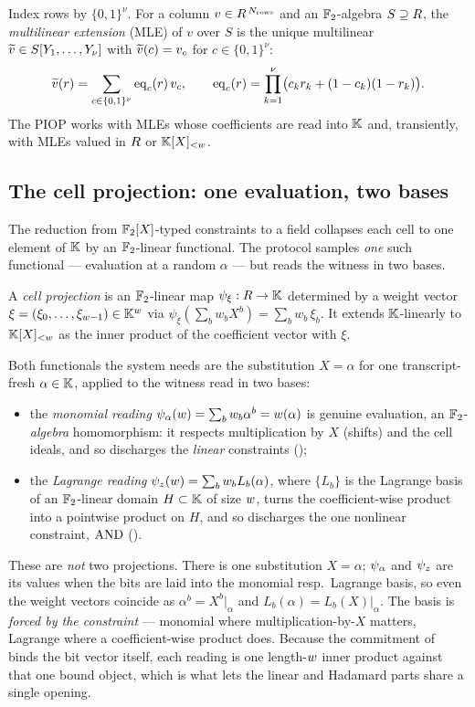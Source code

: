 Index rows by $\{0,1\}^{\nu}$. For a column $v\in R^{\,N_{\mathrm{rows}}}$
and an $\mathbb{F}_2$-algebra $S\supseteq R$, the \emph{multilinear extension}
(MLE) of $v$ over $S$ is the unique multilinear $\widetilde{v}\in S[Y_1,\dots,Y_\nu]$
with $\widetilde{v}(c) = v_c$ for $c\in\{0,1\}^\nu$:
\[
  \widetilde{v}(r) = \sum_{c\in\{0,1\}^{\nu}} \operatorname{eq}_c(r)\,v_c,
  \qquad
  \operatorname{eq}_c(r) = \prod_{k=1}^{\nu}\bigl(c_k r_k + (1-c_k)(1-r_k)\bigr).
\]
The PIOP works with MLEs whose coefficients are read into $\mathbb{K}$ and, transiently,
with MLEs valued in $R$ or $\mathbb{K}[X]_{<w}$.

\subsection{The cell projection: one evaluation, two bases}
\label{sec:projections}

The reduction from $\mathbb{F}_2[X]$-typed constraints to a field collapses each cell
to one element of $\mathbb{K}$ by an $\mathbb{F}_2$-linear functional. The protocol samples
\emph{one} such functional --- evaluation at a random $\alpha$ --- but reads the
witness in two bases.

\begin{definition}
\label{def:projection}
A \emph{cell projection} is an $\mathbb{F}_2$-linear map $\psi_\xi:R\to\mathbb{K}$
determined by a weight vector $\xi = (\xi_0,\dots,\xi_{w-1})\in\mathbb{K}^{w}$
via $\psi_\xi(\sum_b w_b X^b) = \sum_b w_b\,\xi_b$. It extends $\mathbb{K}$-linearly to
$\mathbb{K}[X]_{<w}$ as the inner product of the coefficient vector with $\xi$.
\end{definition}

Both functionals the system needs are the substitution $X = \alpha$ for one
transcript-fresh $\alpha\in\mathbb{K}$, applied to the witness read in two bases:
\begin{itemize}[leftmargin=2em]
  \item the \emph{monomial reading}
    $\psi_{\alpha}(w) = \sum_b w_b\alpha^b = w(\alpha)$ is genuine evaluation, an
    $\mathbb{F}_2$-\emph{algebra} homomorphism: it respects multiplication by $X$
    (shifts) and the cell ideals, and so discharges the \emph{linear}
    constraints ();
  \item the \emph{Lagrange reading} $\psi_{z}(w) = \sum_b w_b L_b(\alpha)$, where
    $\{L_b\}$ is the Lagrange basis of an $\mathbb{F}_2$-linear domain $H\subset\mathbb{K}$ of
    size $w$, turns the coefficient-wise product into a pointwise product on
    $H$, and so discharges the one nonlinear constraint, $\operatorname{AND}$
    ().
\end{itemize}
These are \emph{not} two projections. There is one substitution $X = \alpha$;
$\psi_{\alpha}$ and $\psi_{z}$ are its values when the bits are laid into the monomial
resp.\ Lagrange basis, so even the weight vectors coincide as
$\alpha^b = X^b|_{\alpha}$ and $L_b(\alpha) = L_b(X)|_{\alpha}$. The basis is
\emph{forced by the constraint} --- monomial where multiplication-by-$X$ matters,
Lagrange where a coefficient-wise product does. Because the commitment of
 binds the bit vector itself, each reading is one
length-$w$ inner product against that one bound object, which is what lets
the linear and Hadamard parts share a single opening.

